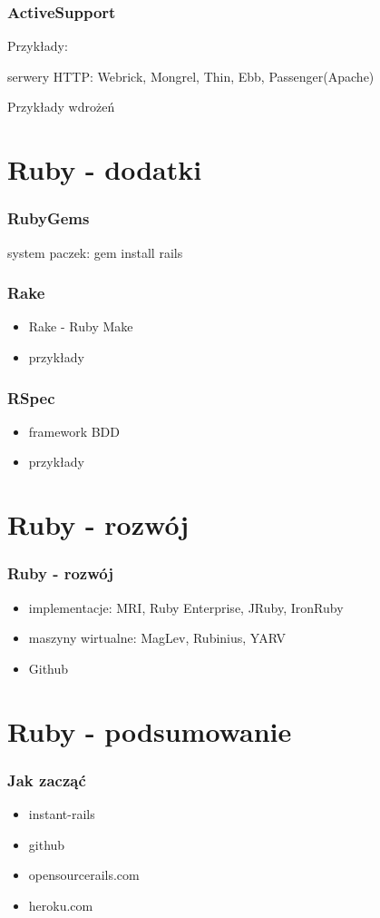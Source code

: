 \documentclass[12t]{beamer}
\begin{document}
\begin{frame}
  \frametitle{ActiveSupport}
	Przykłady:
	
\end{frame}

\begin{frame}
  serwery HTTP: Webrick, Mongrel, Thin, Ebb, Passenger(Apache)
\end{frame}

\begin{frame}
  Przykłady wdrożeń
\end{frame}

\section{Ruby - dodatki}
\begin{frame}
  \frametitle{RubyGems}
  system paczek: gem install rails
\end{frame}

\begin{frame}
  \frametitle{Rake}
  \begin{itemize}
  \item Rake - Ruby Make
  \item przykłady
  \end{itemize}
\end{frame}

\begin{frame}
  \frametitle{RSpec}
  \begin{itemize}
  \item framework BDD
  \item przykłady
  \end{itemize}
\end{frame}

\section{Ruby - rozwój}
\begin{frame}
  \frametitle{Ruby - rozwój}
  \begin{itemize}
  \item implementacje: MRI, Ruby Enterprise, JRuby, IronRuby
  \item maszyny wirtualne: MagLev, Rubinius, YARV
  \item Github
  \end{itemize}
\end{frame}

\section{Ruby - podsumowanie}
\begin{frame}
  \frametitle{Jak zacząć}
  \begin{itemize}
  \item instant-rails
  \item github
  \item opensourcerails.com
  \item heroku.com
  \end{itemize}
\end{frame}
\end{document}
